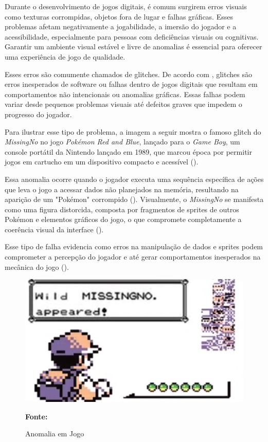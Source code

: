 Durante o desenvolvimento de jogos digitais, é comum surgirem erros visuais como texturas corrompidas, objetos fora de lugar e falhas gráficas. Esses problemas afetam negativamente a jogabilidade, a imersão do jogador e a acessibilidade, especialmente para pessoas com deficiências visuais ou cognitivas. Garantir um ambiente visual estável e livre de anomalias é essencial para oferecer uma experiência de jogo de qualidade.

Esses erros são comumente chamados de glitches. De acordo com , glitches são erros inesperados de software ou falhas dentro de jogos digitais que resultam em comportamentos não intencionais ou anomalias gráficas. Essas falhas podem variar desde pequenos problemas visuais até defeitos graves que impedem o progresso do jogador.

Para ilustrar esse tipo de problema, a imagem a seguir mostra o famoso glitch do \textit{MissingNo} no jogo \textit{Pokémon Red and Blue}, lançado para o \textit{Game Boy}, um console portátil da Nintendo lançado em 1989, que marcou época por permitir jogos em cartucho em um dispositivo compacto e acessível (). 

Essa anomalia ocorre quando o jogador executa uma sequência específica de ações que leva o jogo a acessar dados não planejados na memória, resultando na aparição de um "Pokémon" corrompido (). Visualmente, o \textit{MissingNo} se manifesta como uma figura distorcida, composta por fragmentos de sprites de outros Pokémon e elementos gráficos do jogo, o que compromete completamente a coerência visual da interface (). 

Esse tipo de falha evidencia como erros na manipulação de dados e sprites podem comprometer a percepção do jogador e até gerar comportamentos inesperados na mecânica do jogo ().

\begin{figure}[H]
    \centering

    \caption{Anomalia em Jogo}
    \vspace{0.5cm} %

    \includegraphics[width=12cm]{images/teste.png}

    \vspace{0.4cm} %
    {\small \textbf{Fonte:} }

    \label{fig:bug}
\end{figure}

